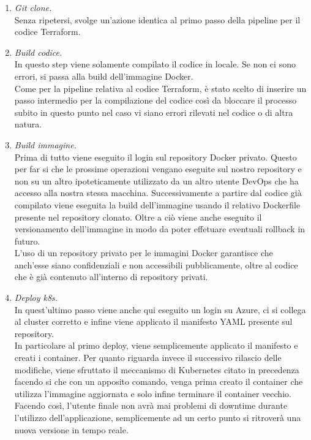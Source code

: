\documentclass[a4paper,12pt]{report}
\begin{document}
\begin{enumerate}
\item \textit{Git clone.}\\
Senza ripetersi, svolge un'azione identica al primo passo della pipeline per il codice Terraform.
\item \textit{Build codice.}\\
In questo step viene solamente compilato il codice in locale. Se non ci sono errori, si passa alla build dell'immagine Docker.\\
Come per la pipeline relativa al codice Terraform, è stato scelto di inserire un passo intermedio per la compilazione del codice così da bloccare il processo subito in questo punto nel caso vi siano errori rilevati nel codice o di altra natura.\\
\item \textit{Build immagine.}\\
Prima di tutto viene eseguito il login sul repository Docker privato. Questo per far si che le prossime operazioni vengano eseguite sul nostro repository e non su un altro ipoteticamente utilizzato da un altro utente DevOps che ha accesso alla nostra stessa macchina. Successivamente a partire dal codice già compilato viene eseguita la build dell'immagine usando il relativo Dockerfile presente nel repository clonato. Oltre a ciò viene anche eseguito il versionamento dell'immagine in modo da poter effetuare eventuali rollback in futuro.\\
L'uso di un repository privato per le immagini Docker garantisce che anch'esse siano confidenziali e non accessibili pubblicamente, oltre al codice che è già contenuto all'interno di repository privati.\\
\item \textit{Deploy k8s.}\\
In quest'ultimo passo viene anche qui eseguito un login su Azure, ci si collega al cluster corretto e infine viene applicato il manifesto YAML presente sul repository.\\
In particolare al primo deploy, viene semplicemente applicato il manifesto e creati i container. Per quanto riguarda invece il successivo rilascio delle modifiche, viene sfruttato il meccanismo di Kubernetes citato in precedenza facendo si che con un apposito comando, venga prima creato il container che utilizza l'immagine aggiornata e solo infine terminare il container vecchio.\\
Facendo così, l'utente finale non avrà mai problemi di downtime durante l'utilizzo dell'applicazione, semplicemente ad un certo punto si ritroverà una nuova versione in tempo reale. \\ \\
\end{enumerate}
\end{document}
